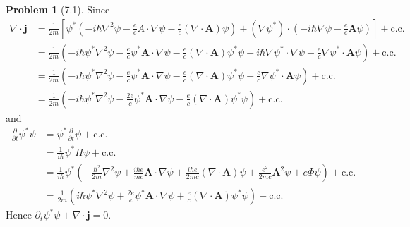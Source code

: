\documentclass[twoside,11pt]{article}
\theoremstyle{definition}
\newtheorem{problem}{Problem}
\theoremstyle{remark}
\begin{document}
\begin{problem}[7.1]
Since
\begin{align*}
    \nabla\cdot\mathbf{j} &= \frac{1}{2m}\left[
        \psi^*(-i\hbar\nabla^2\psi-\frac{e}{c}A\cdot\nabla\psi - \frac{e}{c}(\nabla\cdot\mathbf{A})\psi)
        + (\nabla\psi^*)\cdot(-i\hbar\nabla\psi - \frac{e}{c}\mathbf{A}\psi) 
    \right]+ \mathrm{c.c.} \\ 
    &= \frac{1}{2m}\left(
    -i\hbar\psi^*\nabla^2\psi - \frac{e}{c}\psi^*\mathbf{A}\cdot\nabla\psi 
    -\frac{e}{c}(\nabla\cdot\mathbf{A})\psi^*\psi
    - i\hbar\nabla\psi^*\cdot\nabla\psi
    - \frac{e}{c}\nabla\psi^*\cdot\mathbf{A}\psi 
    \right)+ \mathrm{c.c.} \\ 
    &= \frac{1}{2m}\left(
    -i\hbar\psi^*\nabla^2\psi - \frac{e}{c}\psi^*\mathbf{A}\cdot\nabla\psi 
    -\frac{e}{c}(\nabla\cdot\mathbf{A})\psi^*\psi
    - \frac{e}{c}\nabla\psi^*\cdot\mathbf{A}\psi 
    \right)+ \mathrm{c.c.} \\ 
    &= \frac{1}{2m}\left(
    -i\hbar\psi^*\nabla^2\psi - \frac{2e}{c}\psi^*\mathbf{A}\cdot\nabla\psi 
    -\frac{e}{c}(\nabla\cdot\mathbf{A})\psi^*\psi 
    \right) + \mathrm{c.c.}
\end{align*}
and
\begin{align*}
    \frac{\partial}{\partial t}\psi^*\psi &= \psi^*\frac{\partial}{\partial t}\psi + \mathrm{c.c.}\\
    &= \frac{1}{i\hbar}\psi^* H\psi + \mathrm{c.c.}\\
    &= \frac{1}{i\hbar}\psi^*\left(
        -\frac{\hbar^2}{2m}\nabla^2\psi + \frac{i\hbar e}{mc}\mathbf{A}\cdot\nabla\psi
        + \frac{i\hbar e}{2mc}(\nabla\cdot \mathbf{A})\psi + \frac{e^2}{2mc}\mathbf{A}^2\psi
        +e\Phi\psi
    \right) + \mathrm{c.c.}\\
    &= \frac{1}{2m}\left(
        i\hbar\psi^*\nabla^2\psi + \frac{2e}{c}\psi^*\mathbf{A}\cdot\nabla\psi 
        + \frac{e}{c}(\nabla\cdot\mathbf{A})\psi^*\psi
    \right) + \mathrm{c.c.}
\end{align*}
Hence $\partial_t \psi^*\psi + \nabla\cdot\mathbf{j} = 0$.
\end{problem}
\end{document}
